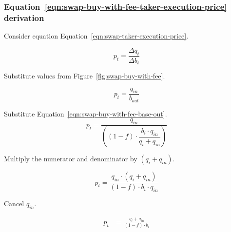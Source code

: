 \subsubsection{Equation~\ref{eqn:swap-buy-with-fee-taker-execution-price} derivation}%
\label{sssec:equation-eqn-swap-buy-with-fee-taker-execution-price-derivation}

Consider equation Equation~\ref{eqn:swap-taker-execution-price}.

\begin{equation}
	p_t = \frac{\Delta q_t}{\Delta b_t} \nonumber
\end{equation}

Substitute values from Figure~\ref{fig:swap-buy-with-fee}.

\begin{equation}
	p_t = \frac{q_{in}}{b_{out}} \nonumber
\end{equation}

Substitute Equation~\ref{eqn:swap-buy-with-fee-base-out}.
\begin{equation}
	p_t = \frac{q_{in}}{\left((1 - f) \cdot \dfrac{b_i \cdot q_{in}}{q_i + q_{in}}\right)}
	\nonumber
\end{equation}

Multiply the numerator and denominator by $(q_i + q_{in})$.

\begin{equation}
	p_t = \frac{q_{in} \cdot (q_i + q_{in})}{(1 - f) \cdot b_i \cdot q_{in}} \nonumber
\end{equation}

Cancel $q_{in}$.

\begin{align}
	p_t & = \frac{q_i + q_{in}}{(1 - f) \cdot b_i} \nonumber
\end{align}
